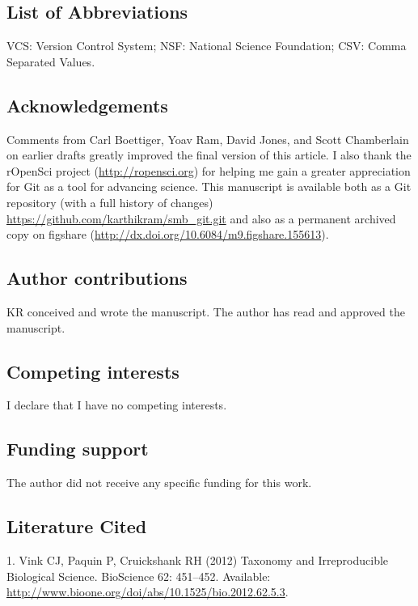\documentclass[]{article}
\begin{document}
\subsection{List of Abbreviations}

VCS: Version Control System; NSF: National Science Foundation; CSV:
Comma Separated Values.

\subsection{Acknowledgements}

Comments from Carl Boettiger, Yoav Ram, David Jones, and Scott
Chamberlain on earlier drafts greatly improved the final version of this
article. I also thank the rOpenSci project (\url{http://ropensci.org})
for helping me gain a greater appreciation for Git as a tool for
advancing science. This manuscript is available both as a Git repository
(with a full history of changes)
\url{https://github.com/karthikram/smb_git.git} and also as a permanent
archived copy on figshare
(\url{http://dx.doi.org/10.6084/m9.figshare.155613}).

\subsection{Author contributions}

KR conceived and wrote the manuscript. The author has read and approved
the manuscript.

\subsection{Competing interests}

I declare that I have no competing interests.

\subsection{Funding support}

The author did not receive any specific funding for this work.

\subsection{Literature Cited}

1. Vink CJ, Paquin P, Cruickshank RH (2012) Taxonomy and Irreproducible
Biological Science. BioScience 62: 451--452. Available:
\url{http://www.bioone.org/doi/abs/10.1525/bio.2012.62.5.3}.
\end{document}
